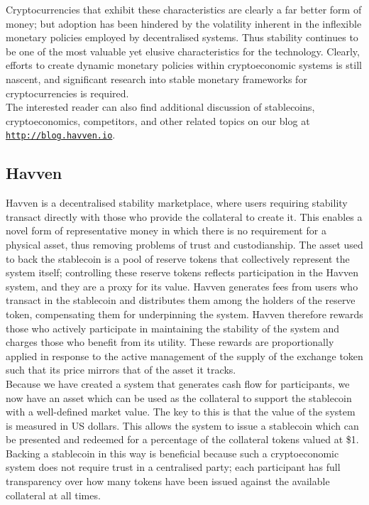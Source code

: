 \noindent Cryptocurrencies that exhibit these characteristics are clearly a far better form of money; but adoption has been hindered by the volatility inherent in the inflexible monetary policies employed by decentralised systems. Thus stability continues to be one of the most valuable yet elusive characteristics for the technology. Clearly, efforts to create dynamic monetary policies within cryptoeconomic systems is still nascent, and significant research into stable monetary frameworks for cryptocurrencies is required. \\

\noindent The interested reader can also find additional discussion of stablecoins,
cryptoeconomics, competitors, and other related topics on our blog at \href{http://blog.havven.io}{\texttt{http://blog.havven.io}}.

\subsection{Havven}

\noindent Havven is a decentralised stability marketplace, where users requiring stability transact directly with those who provide the collateral to create it. This enables a novel form of representative money in which there is no requirement for a physical asset, thus removing problems of trust and custodianship. The asset used to back the stablecoin is a pool of reserve tokens that collectively represent the system itself; controlling these reserve tokens reflects participation in the Havven system, and they are a proxy for its value. Havven generates fees from users who transact in the stablecoin and distributes them among the holders of the reserve token, compensating them for underpinning the system. Havven therefore rewards those who actively participate in maintaining the stability of the system and charges those who benefit from its utility. These rewards are proportionally applied in response to the active management of the supply of the exchange token such that its price mirrors that of the asset it tracks. \\

\noindent Because we have created a system that generates cash flow for participants, we now have an asset which can be used as the collateral to support the stablecoin with a well-defined market value. The key to this is that the value of the system is measured in US dollars. This allows the system to issue a stablecoin which can be presented and redeemed for a percentage of the collateral tokens valued at \$1. Backing a stablecoin in this way is beneficial because such a cryptoeconomic system does not require trust in a centralised party; each participant has full transparency over how many tokens have been issued against the available collateral at all times. \\

